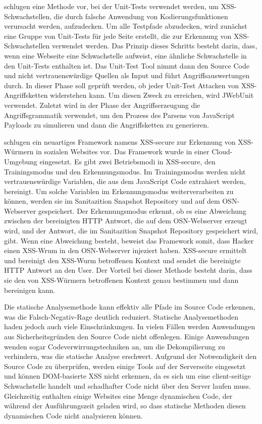 \textcite[365]{mohammadi2017} schlugen eine Methode vor, bei der Unit-Tests verwendet werden, um XSS-Schwachstellen, die durch falsche Anwendung von Kodierungsfunktionen verursacht werden, aufzudecken. Um alle Testpfade abzudecken, wird zunächst eine Gruppe von Unit-Tests für jede Seite erstellt, die zur Erkennung von XSS-Schwachstellen verwendet werden. Das Prinzip dieses Schritts besteht darin, dass, wenn eine Webseite eine Schwachstelle aufweist, eine ähnliche Schwachstelle in den Unit-Tests enthalten ist. Das Unit-Test Tool nimmt dann den Source Code und nicht vertrauenswürdige Quellen als Input und führt Angriffsauswertungen durch. In dieser Phase soll geprüft werden, ob jeder Unit-Test Attacken von XSS-Angriffsketten widerstehen kann. Um diesen Zweck zu erreichen, wird JWebUnit verwendet. Zuletzt wird in der Phase der Angriffserzeugung die Angriffsgrammatik verwendet, um den Prozess des Parsens von JavaScript Payloads zu simulieren und dann die Angriffsketten zu generieren.

\textcite{gupta2018} schlugen ein neuartiges Framework namens XSS-secure zur Erkennung von XSS-Würmern in sozialen Websites vor. Das Framework wurde in einer Cloud-Umgebung eingesetzt. Es gibt zwei Betriebsmodi in XSS-secure, den Trainingsmodus und den Erkennungsmodus. Im Trainingsmodus werden nicht vertrauenswürdige Variablen, die aus dem JavaScript Code extrahiert werden, bereinigt. Um solche Variablen im Erkennungsmodus weiterverarbeiten zu können, werden sie im Sanitazition Snapshot Repository und auf dem OSN-Webserver gespeichert. Der Erkennungsmodus erkennt, ob es eine Abweichung zwischen der bereinigten HTTP Antwort, die auf dem OSN-Webserver erzeugt wird, und der Antwort, die im Sanitazition Snapshot Repository gespeichert wird, gibt. Wenn eine Abweichung besteht, beweist das Framework somit, dass Hacker einen XSS-Wrum in den OSN-Webserver injeziert haben. XSS-secure ermittelt und bereinigt den XSS-Wurm betroffenen Kontext und sendet die bereinigte HTTP Antwort an den User. Der Vorteil bei dieser Methode besteht darin, dass sie den von XSS-Würmern betroffenen Kontext genau bestimmen und dann bereinigen kann.

Die statische Analysemethode kann effektiv alle Pfade im Source Code erkennen, was die Falsch-Negativ-Rage deutlich reduziert. Statische Analysemethoden haden jedoch auch viele Einschränkungen. In vielen Fällen werden Anwendungen aus Sicherheitsgründen den Source Code nicht offenlegen. Einige Anwendungen wenden sogar Codeverwirrungstechniken an, um die Dekompilierung zu verhindern, was die statische Analyse erschwert. Aufgrund der Notwendigkeit den Source Code zu überprüfen, werden einige Tools auf der Serverseite eingesetzt und können DOM-basierte XSS nicht erkennen, da es sich um eine client-seitige Schwachstelle handelt und schadhafter Code nicht über den Server laufen muss. Gleichzeitig enthalten einige Websites eine Menge dynamischen Code, der während der Ausführungszeit geladen wird, so dass statische Methoden diesen dynamischen Code nicht analysieren können. \autocite[182008]{liu2019}

